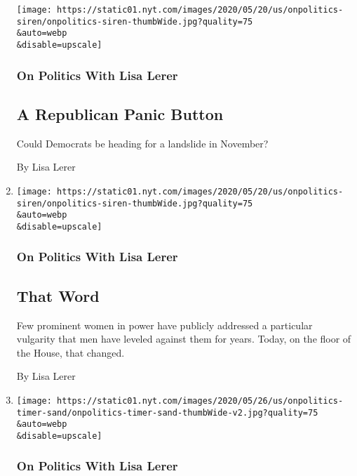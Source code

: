 \begin{enumerate}
  \texttt{[image: https://static01.nyt.com/images/2020/05/20/us/onpolitics-siren/onpolitics-siren-thumbWide.jpg?quality=75\\\&auto=webp\\\&disable=upscale]}

  \hypertarget{on-politics-with-lisa-lerer-2}{%
  \subsubsection{On Politics With Lisa
  Lerer}\label{on-politics-with-lisa-lerer-2}}

  \hypertarget{a-republican-panic-button}{%
  \subsection{A Republican Panic
  Button}\label{a-republican-panic-button}}

  Could Democrats be heading for a landslide in November?

  By Lisa Lerer
\item
  \href{/2020/07/23/us/politics/aoc-women-ted-yoho.html}{}

  \texttt{[image: https://static01.nyt.com/images/2020/05/20/us/onpolitics-siren/onpolitics-siren-thumbWide.jpg?quality=75\\\&auto=webp\\\&disable=upscale]}

  \hypertarget{on-politics-with-lisa-lerer-3}{%
  \subsubsection{On Politics With Lisa
  Lerer}\label{on-politics-with-lisa-lerer-3}}

  \hypertarget{that-word}{%
  \subsection{That Word}\label{that-word}}

  Few prominent women in power have publicly addressed a particular
  vulgarity that men have leveled against them for years. Today, on the
  floor of the House, that changed.

  By Lisa Lerer
\item
  \href{/2020/07/22/us/politics/miami-mayor-francis-suarez-masks.html}{}

  \texttt{[image: https://static01.nyt.com/images/2020/05/26/us/onpolitics-timer-sand/onpolitics-timer-sand-thumbWide-v2.jpg?quality=75\\\&auto=webp\\\&disable=upscale]}

  \hypertarget{on-politics-with-lisa-lerer-4}{%
  \subsubsection{On Politics With Lisa
  Lerer}\label{on-politics-with-lisa-lerer-4}}


\end{enumerate}
